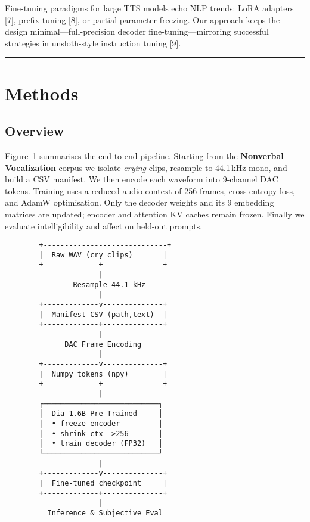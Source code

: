 \documentclass{article}
\begin{document}
Fine-tuning paradigms for large TTS models echo NLP trends: LoRA
adapters {[}7{]}, prefix-tuning {[}8{]}, or partial parameter freezing.
Our approach keeps the design minimal---full-precision decoder
fine-tuning---mirroring successful strategies in unsloth-style
instruction tuning {[}9{]}.

\begin{center}\rule{0.5\linewidth}{0.5pt}\end{center}

\hypertarget{methods}{%
\section{Methods}\label{methods}}

\hypertarget{overview}{%
\subsection{Overview}\label{overview}}

Figure~1 summarises the end-to-end pipeline. Starting from the
\textbf{Nonverbal Vocalization} corpus we isolate \emph{crying} clips,
resample to 44.1\,kHz mono, and build a CSV manifest. We then encode
each waveform into 9-channel DAC tokens. Training uses a reduced audio
context of 256 frames, cross-entropy loss, and AdamW optimisation. Only
the decoder weights and its 9 embedding matrices are updated; encoder
and attention KV caches remain frozen. Finally we evaluate
intelligibility and affect on held-out prompts.

\begin{verbatim}
        +-----------------------------+
        |  Raw WAV (cry clips)       |
        +-------------+--------------+
                      |
                Resample 44.1 kHz
                      |
        +-------------v--------------+
        |  Manifest CSV (path,text)  |
        +-------------+--------------+
                      |
              DAC Frame Encoding
                      |
        +-------------v--------------+
        |  Numpy tokens (npy)        |
        +-------------+--------------+
                      |
        ┌───────────────────────────┐
        │  Dia-1.6B Pre-Trained     │
        │  • freeze encoder         │
        │  • shrink ctx-->256       │
        │  • train decoder (FP32)   │
        └───────────────────────────┘
                      |
        +-------------v--------------+
        |  Fine-tuned checkpoint     |
        +-------------+--------------+
                      |
          Inference & Subjective Eval
\end{verbatim}
\end{document}
